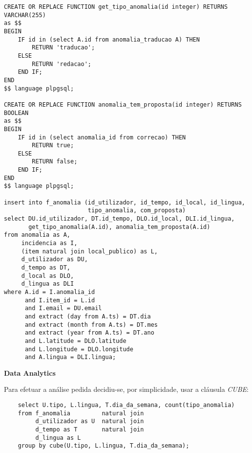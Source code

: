 \documentclass[12pt]{report}
\begin{document}
\begin{verbatim}
CREATE OR REPLACE FUNCTION get_tipo_anomalia(id integer) RETURNS VARCHAR(255)
as $$
BEGIN
    IF id in (select A.id from anomalia_traducao A) THEN
        RETURN 'traducao';
    ELSE
        RETURN 'redacao';
    END IF;
END
$$ language plpgsql;

CREATE OR REPLACE FUNCTION anomalia_tem_proposta(id integer) RETURNS BOOLEAN
as $$
BEGIN
    IF id in (select anomalia_id from correcao) THEN
        RETURN true;
    ELSE
        RETURN false;
    END IF;
END
$$ language plpgsql;

insert into f_anomalia (id_utilizador, id_tempo, id_local, id_lingua,
                        tipo_anomalia, com_proposta)
select DU.id_utilizador, DT.id_tempo, DLO.id_local, DLI.id_lingua,
       get_tipo_anomalia(A.id), anomalia_tem_proposta(A.id)
from anomalia as A,
     incidencia as I,
     (item natural join local_publico) as L,
     d_utilizador as DU,
     d_tempo as DT,
     d_local as DLO,
     d_lingua as DLI
where A.id = I.anomalia_id
      and I.item_id = L.id
      and I.email = DU.email
      and extract (day from A.ts) = DT.dia
      and extract (month from A.ts) = DT.mes
      and extract (year from A.ts) = DT.ano
      and L.latitude = DLO.latitude
      and L.longitude = DLO.longitude
      and A.lingua = DLI.lingua;
    \end{verbatim}


    \Large
    \textbf{Data Analytics}\\
    \normalsize
    \par Para efetuar a análise pedida decidiu-se, por simplicidade, usar a cláusula \textit{CUBE}:
    \footnotesize \begin{verbatim}
    select U.tipo, L.lingua, T.dia_da_semana, count(tipo_anomalia)
    from f_anomalia         natural join
         d_utilizador as U  natural join
         d_tempo as T       natural join
         d_lingua as L
    group by cube(U.tipo, L.lingua, T.dia_da_semana);
    \end{verbatim}\normalsize
\end{document}
